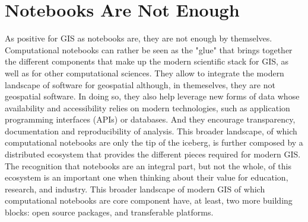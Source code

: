 \documentclass[11pt,letterpaper]{article}
\begin{document}

\section{Notebooks Are Not Enough}

As positive for GIS as notebooks are, they are not enough by themselves.
Computational notebooks can rather be seen as the "glue" that brings together the different components that make up the modern scientific stack for GIS, as well as for other computational sciences.
%
They allow to integrate the modern landscape of software for geospatial although, in themeselves, they are not geospatial software.
%
In doing so, they also help leverage new forms of data whose availability and accessibility relies on modern technologies, such as application programming interfaces (APIs) or databases.
%
And they encourage transparency, documentation and reproducibility of analysis.
This broader landscape, of which computational notebooks are only the tip of the iceberg, is further composed by a distributed ecosystem that provides the different pieces required for modern GIS.
The recognition that notebooks are an integral part, but not the whole, of this ecosystem is an important one when thinking about their value for education, research, and industry.
This broader landscape of modern GIS of which computational notebooks are core component have, at least, two more building blocks: open source packages, and transferable platforms.
\end{document}
